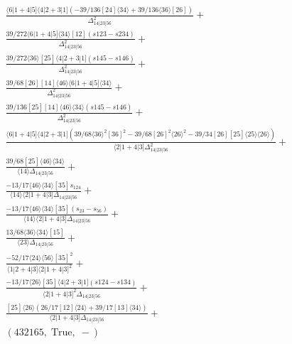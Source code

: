 \documentclass[varwidth, border=5pt]{standalone}
\begin{document}
\begin{my}
$\begin{gathered}
\scriptscriptstyle\frac{⟨6|1+4|5]⟨4|2+3|1]\scriptscriptstyle(-39/136[24]⟨34⟩+39/136⟨36⟩[26])}{Δ_{14|23|56}^2}+\\
\scriptscriptstyle\frac{39/272⟨6|1+4|5]⟨34⟩[12]\scriptscriptstyle(s123-s234)}{Δ_{14|23|56}^2}+\\
\scriptscriptstyle\frac{39/272⟨36⟩[25]⟨4|2+3|1]\scriptscriptstyle(s145-s146)}{Δ_{14|23|56}^2}+\\
\scriptscriptstyle\frac{39/68[26][14]⟨46⟩⟨6|1+4|5]⟨34⟩}{Δ_{14|23|56}^2}+\\
\scriptscriptstyle\frac{39/136[25][14]⟨46⟩⟨34⟩\scriptscriptstyle(s145-s146)}{Δ_{14|23|56}^2}+\\
\scriptscriptstyle\frac{⟨6|1+4|5]⟨4|2+3|1]\scriptscriptstyle(39/68⟨36⟩^2[36]^2-39/68[26]^2⟨26⟩^2-39/34[26][25]⟨25⟩⟨26⟩)}{⟨2|1+4|3]Δ_{14|23|56}^2}+\\
\scriptscriptstyle\frac{39/68[25]⟨46⟩⟨34⟩}{⟨14⟩Δ_{14|23|56}}+\\
\scriptscriptstyle\frac{-13/17⟨46⟩⟨34⟩[35]s_{124}}{⟨14⟩⟨2|1+4|3]Δ_{14|23|56}}+\\
\scriptscriptstyle\frac{-13/17⟨46⟩⟨34⟩[35]\scriptscriptstyle(s_{23}-s_{56})}{⟨14⟩⟨2|1+4|3]Δ_{14|23|56}}+\\
\scriptscriptstyle\frac{13/68⟨36⟩⟨34⟩[15]}{⟨23⟩Δ_{14|23|56}}+\\
\scriptscriptstyle\frac{-52/17⟨24⟩⟨56⟩[35]^2}{⟨1|2+4|3]⟨2|1+4|3]^2}+\\
\scriptscriptstyle\frac{-13/17⟨26⟩[35]⟨4|2+3|1]\scriptscriptstyle(s124-s134)}{⟨2|1+4|3]^2Δ_{14|23|56}}+\\
\scriptscriptstyle\frac{[25]⟨26⟩\scriptscriptstyle(26/17[12]⟨24⟩+39/17[13]⟨34⟩)}{⟨2|1+4|3]Δ_{14|23|56}}+\\
\scriptscriptstyle(432165,\;\text{True},\;-)\phantom{+}
\end{gathered}$
\end{my}
\end{document}
